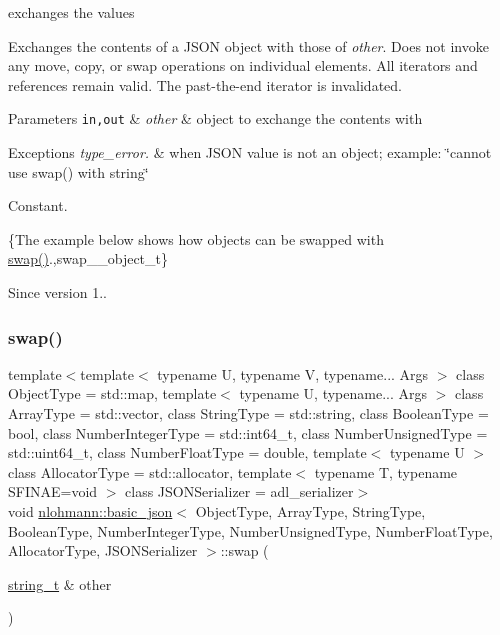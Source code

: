 exchanges the values 

Exchanges the contents of a J\+S\+ON object with those of {\itshape other}. Does not invoke any move, copy, or swap operations on individual elements. All iterators and references remain valid. The past-\/the-\/end iterator is invalidated.


\begin{DoxyParams}[1]{Parameters}
\mbox{\tt in,out}  & {\em other} & object to exchange the contents with\\
\hline
\end{DoxyParams}

\begin{DoxyExceptions}{Exceptions}
{\em type\+\_\+error.} & when J\+S\+ON value is not an object; example\+: {\ttfamily \char`\"{}cannot use swap() with string\char`\"{}}\\
\hline
\end{DoxyExceptions}
Constant.

\{The example below shows how objects can be swapped with {\ttfamily \mbox{\hyperlink{classnlohmann_1_1basic__json_a8c9d932353e1ab98a7dc2fc27e002031}{swap()}}}.,swap\+\_\+\+\_\+object\+\_\+t\}

\begin{DoxySince}{Since}
version 1.. 
\end{DoxySince}
\mbox{\label{classnlohmann_1_1basic__json_adaa1ed0a889d86c8e0216a3d66980f76}} 
\subsubsection{\texorpdfstring{swap()}{swap()}\hspace{0.1cm}{\footnotesize\ttfamily [4/4]}}
{\footnotesize\ttfamily template$<$template$<$ typename U, typename V, typename... Args $>$ class Object\+Type = std\+::map, template$<$ typename U, typename... Args $>$ class Array\+Type = std\+::vector, class String\+Type  = std\+::string, class Boolean\+Type  = bool, class Number\+Integer\+Type  = std\+::int64\+\_\+t, class Number\+Unsigned\+Type  = std\+::uint64\+\_\+t, class Number\+Float\+Type  = double, template$<$ typename U $>$ class Allocator\+Type = std\+::allocator, template$<$ typename T, typename S\+F\+I\+N\+A\+E=void $>$ class J\+S\+O\+N\+Serializer = adl\+\_\+serializer$>$ \\
void \mbox{\hyperlink{classnlohmann_1_1basic__json}{nlohmann\+::basic\+\_\+json}}$<$ Object\+Type, Array\+Type, String\+Type, Boolean\+Type, Number\+Integer\+Type, Number\+Unsigned\+Type, Number\+Float\+Type, Allocator\+Type, J\+S\+O\+N\+Serializer $>$\+::swap (\begin{DoxyParamCaption}\item[{\mbox{\hyperlink{classnlohmann_1_1basic__json_a61f8566a1a85a424c7266fb531dca005}{string\+\_\+t}} \&}]{other }\end{DoxyParamCaption})\hspace{0.3cm}{\ttfamily [inline]}}



